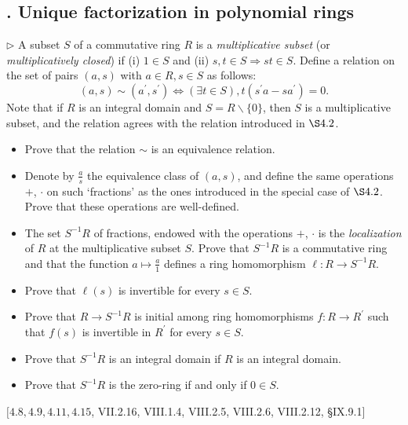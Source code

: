 \subsection{. Unique factorization in polynomial rings}
\begin{problem}[4.7]
$\triangleright$ A subset $S$ of a commutative ring $R$ is a \emph{multiplicative subset} (or \emph{multiplicatively closed}) if (i) $1 \in S$ and (ii) $s, t \in S \Longrightarrow s t \in S$. Define a relation on the set of pairs $(a, s)$ with $a \in R, s \in S$ as follows:
$$
(a, s) \sim\left(a^{\prime}, s^{\prime}\right) \Longleftrightarrow(\exists t \in S), t\left(s^{\prime} a-s a^{\prime}\right)=0 .
$$
Note that if $R$ is an integral domain and $S=R \backslash\{0\}$, then $S$ is a multiplicative subset, and the relation agrees with the relation introduced in $\S 4.2$.
\begin{itemize}
    \item Prove that the relation $\sim$ is an equivalence relation.
    \item Denote by $\frac{a}{s}$ the equivalence class of $(a, s)$, and define the same operations $+$, $\cdot$ on such `fractions' as the ones introduced in the special case of $\S 4.2$. Prove that these operations are well-defined.
    \item The set $S^{-1} R$ of fractions, endowed with the operations $+$, $\cdot$ is the \emph{localization} of $R$ at the multiplicative subset $S$. Prove that $S^{-1} R$ is a commutative ring and that the function $a \mapsto \frac{a}{1}$ defines a ring homomorphism $\ell: R \rightarrow S^{-1} R$.
    \item Prove that $\ell(s)$ is invertible for every $s \in S$.
    \item Prove that $R \rightarrow S^{-1} R$ is initial among ring homomorphisms $f: R \rightarrow R^{\prime}$ such that $f(s)$ is invertible in $R^{\prime}$ for every $s \in S$.
    \item Prove that $S^{-1} R$ is an integral domain if $R$ is an integral domain.
    \item Prove that $S^{-1} R$ is the zero-ring if and only if $0 \in S$.
\end{itemize}
$[4.8,4.9,4.11,4.15$, VII.2.16, VIII.1.4, VIII.2.5, VIII.2.6, VIII.2.12, §IX.9.1]
\end{problem}
